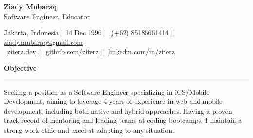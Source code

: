 \documentclass{article}
\newcommand{\header}[1]{
	\vspace{4mm}
	{\large \noindent \textbf{#1}}
	\vspace{1mm}
	\hrule
	\vspace{1mm}
}
\begin{document}
	\begin{flushleft}
		{\LARGE \textbf{Ziady Mubaraq}} \\
		{\large Software Engineer, Educator}

		\vspace{1mm}
		
		Jakarta, Indonesia  $\mid$ 14 Dec 1996 $\mid$ \faWhatsapp ~\href{https://wa.me/6285186661414}{\underline{(+62) 85186661414}} $\mid$ \faEnvelope[regular] \href{mailto:ziady.mubaraq@gmail.com}{\underline{ziady.mubaraq@gmail.com}} \\
		\faLink ~\href{https://ziterz.dev}{\underline{ziterz.dev}}  $\mid$ \faGithub ~\href{https://github.com/ziterz}{\underline{github.com/ziterz}} $\mid$ \faLinkedin ~\href{https://linkedin.com/in/ziterz}{\underline{linkedin.com/in/ziterz}}
	\end{flushleft}

	\vspace{-4mm}

	\header{Objective}
		\vspace{1mm}
		Seeking a position as a Software Engineer specializing in iOS/Mobile Development, aiming to leverage 4 years of experience in web and mobile development, including both native and hybrid approaches. Having a proven track record of mentoring and leading teams at coding bootcamps, I maintain a strong work ethic and excel at adapting to any situation.

	\setlength{\columnsep}{1.5em}
\end{document}
